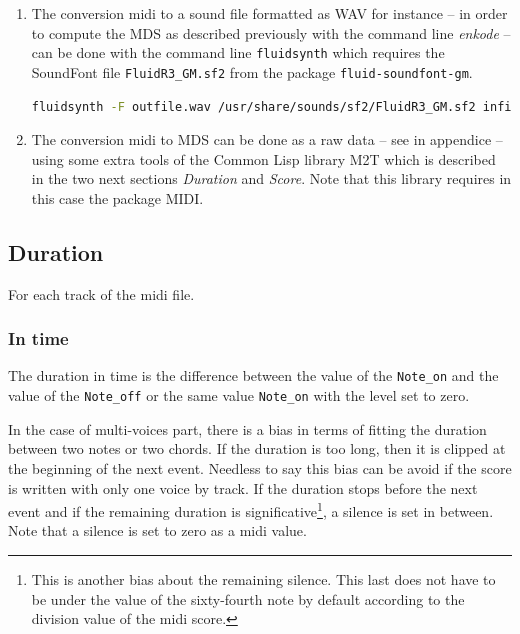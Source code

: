 \begin{enumerate}
\item The conversion midi to a sound file formatted as WAV for instance -- in order to compute the MDS as described previously with the command line \textsl{enkode} -- can be done with the command line \texttt{fluidsynth} which requires the SoundFont file \texttt{FluidR3\_GM.sf2} from the package \texttt{fluid-soundfont-gm}.
\begin{lstlisting}[language=bash]
fluidsynth -F outfile.wav /usr/share/sounds/sf2/FluidR3_GM.sf2 infile.mid
\end{lstlisting}
\item The conversion midi to MDS can be done as a raw data -- see \textsl{} in appendice  -- using some extra tools of the Common Lisp library M2T which is described in the two next sections \textsl{Duration} and \textsl{Score}. Note that this library requires in this case the package MIDI. 

\end{enumerate}

\subsection{Duration}

For each track of the midi file.

\subsubsection{In time}

The duration in time is the difference between the value of the \texttt{Note\_on} and the value of the \texttt{Note\_off} or the same value \texttt{Note\_on} with the level set to zero.

In the case of multi-voices part, there is a bias in terms of fitting the duration between two notes or two chords. If the duration is too long, then it is clipped at the beginning of the next event. Needless to say this bias can be avoid if the score is written with only one voice by track. If the duration stops before the next event and if the remaining duration is significative\footnote{This is another bias about the remaining silence. This last does not have to be under the value of the sixty-fourth note
by default according to the division value of the midi score.}, a silence is set in between. Note that a silence is set to zero as a midi value.

